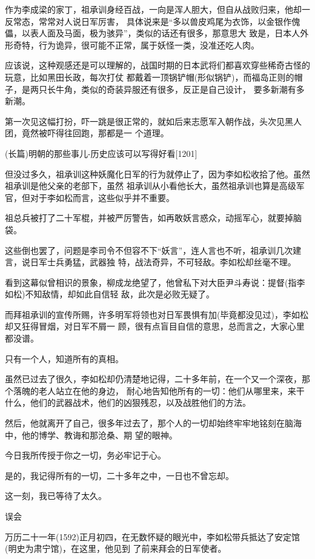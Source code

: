 \documentclass[11pt,a4paper,onecolumn]{article}
\begin{document}
作为李成梁的家丁，祖承训身经百战，一向是浑人胆大，但自从战败归来，他却一反常态，常常对人说日军厉害，
具体说来是``多以兽皮鸡尾为衣饰，以金银作傀儡，以表人面及马面，极为骇异''，类似的话还有很多，那意思大
致是，日本人外形奇特，行为诡异，很可能不正常，属于妖怪一类，没准还吃人肉。

应该说，这种观感还是可以理解的，战国时期的日本武将们都喜欢穿些稀奇古怪的玩意，比如黑田长政，每次打仗
都戴着一顶锅铲帽(形似锅铲)，而福岛正则的帽子，是两只长牛角，类似的奇装异服还有很多，反正是自己设计，
要多新潮有多新潮。

第一次见这幅打扮，吓一跳是很正常的，就如后来志愿军入朝作战，头次见黑人团，竟然被吓得往回跑，那都是一
个道理。

(长篇)明朝的那些事儿-历史应该可以写得好看$[$1201$]$

但没过多久，祖承训这种妖魔化日军的行为就停止了，因为李如松收拾了他。虽然祖承训是他父亲的老部下，虽然
祖承训从小看他长大，虽然祖承训也算是高级军官，但对于李如松而言，这些似乎并不重要。

祖总兵被打了二十军棍，并被严厉警告，如再敢妖言惑众，动摇军心，就要掉脑袋。

这些倒也罢了，问题是李司令不但容不下``妖言''，连人言也不听，祖承训几次建言，说日军士兵勇猛，武器独
特，战法奇异，不可轻敌。李如松却丝毫不理。

看到这幕似曾相识的景象，柳成龙绝望了，他曾私下对大臣尹斗寿说：提督(指李如松)不知敌情，却如此自信轻
敌，此次是必败无疑了。

而拜祖承训的宣传所赐，许多明军将领也对日军畏惧有加(毕竟都没见过)，李如松却又狂得冒烟，对日军不屑一
顾，很有点盲目自信的意思，总而言之，大家心里都没谱。

只有一个人，知道所有的真相。

虽然已过去了很久，李如松却仍清楚地记得，二十多年前，在一个又一个深夜，那个落魄的老人站立在他的身边，
耐心地告知他所有的一切：他们从哪里来，来干什么，他们的武器战术，他们的凶狠残忍，以及战胜他们的方法。

然后，他就离开了自己，很多年过去了，那个人的一切却始终牢牢地铭刻在脑海中，他的博学、教诲和那沧桑、期
望的眼神。

今日我所传授于你之一切，务必牢记于心。

是的，我记得所有的一切，二十多年之中，一日也不曾忘却。

这一刻，我已等待了太久。

误会

万历二十一年(1592)正月初四，在无数怀疑的眼光中，李如松带兵抵达了安定馆(明史为肃宁馆)，在这里，他见到
了前来拜会的日军使者。
\end{document}
